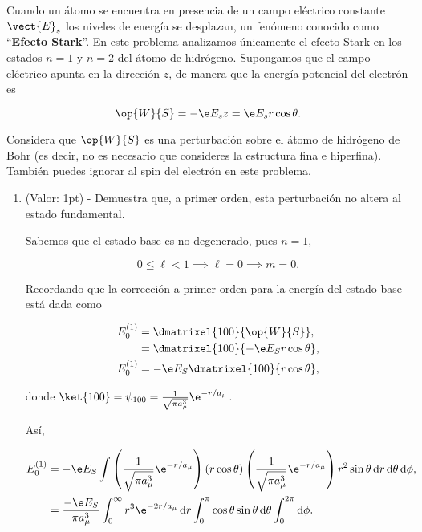 \documentclass[./../main.tex]{subfiles}
\begin{document}
    \begin{exercise}
        Cuando un átomo se encuentra en presencia de un campo eléctrico constante \(\vect{E}_{s}\) los niveles de energía se desplazan, un fenómeno conocido como ``\textbf{Efecto Stark}''. En este problema analizamos únicamente el efecto Stark en los estados \(n = 1\) y \(n = 2\) del átomo de hidrógeno. Supongamos que el campo eléctrico apunta en la dirección \(z\), de manera que la energía potencial del electrón es

        \begin{equation*}
            \op{W}{S} = -\e E_{s}z = \e E_{s}r\cos\theta.
        \end{equation*}

        Considera que \(\op{W}{S}\) es una perturbación sobre el átomo de hidrógeno de Bohr (es decir, no es necesario que consideres la estructura fina e hiperfina). También puedes ignorar al spin del electrón en este problema.

        \begin{enumerate}
            \item (Valor: 1pt) - Demuestra que, a primer orden, esta perturbación no altera al estado fundamental.
            
            \begin{solution}
                Sabemos que el estado base es no-degenerado, pues 
                \(n = 1\),

                \begin{equation*}
                    0 \leq \ell < 1 \implies \ell = 0 \implies m = 0.
                \end{equation*}

                Recordando que la corrección a primer orden para la energía del estado base está dada como

                \begin{align*}
                    E_{0}^{(1)} &= \dmatrixel{100}{\op{W}{S}},\\
                    &= \dmatrixel{100}{-\e E_{S}r\cos\theta},\\
                    E_{0}^{(1)} &= -\e E_{S}\dmatrixel{100}{r\cos\theta},
                \end{align*}

                donde \(\ket{100} = \psi_{100} = \tfrac{1}{\sqrt{\pi a_{\mu}^{3}}}\e^{-r/a_{\mu}}\).

                Así,

                \begin{align*}
                    E_{0}^{(1)} &= -\e E_{S}\int\left(\dfrac{1}{\sqrt{\pi a_{\mu}^{3}}}\e^{-r/a_{\mu}}\right)(r\cos\theta)\left(\dfrac{1}{\sqrt{\pi a_{\mu}^{3}}}\e^{-r/a_{\mu}}\right)r^{2}\sin\theta\odif{r,\theta,\phi},\\
                    &= \dfrac{-\e E_{S}}{\pi a_{\mu}^{3}}\int_{0}^{\infty}r^{3}\e^{-2r/a_{\mu}}\odif{r}\int_{0}^{\pi}\cos\theta\sin\theta\odif{\theta}\int_{0}^{2\pi}\odif{\phi}.
                \end{align*}


\end{solution}
\end{enumerate}
\end{exercise}
\end{document}
